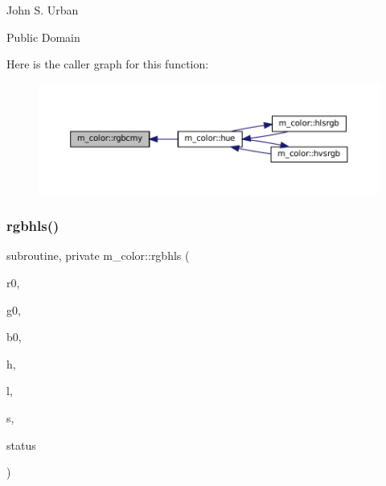 \begin{DoxyDescription}
\item[A\+U\+T\+H\+OR ]

John S. Urban




\item[L\+I\+C\+E\+N\+SE ]

Public Domain




\end{DoxyDescription}Here is the caller graph for this function\+:\nopagebreak
\begin{figure}[H]
\begin{center}
\leavevmode
\includegraphics[width=350pt]{namespacem__color_ad6e8505eef5add299c4475d289f3c5c5_icgraph}
\end{center}
\end{figure}
\mbox{\label{namespacem__color_a1dd027cbe65112af243d26195b1fc49a}} 
\subsubsection{\texorpdfstring{rgbhls()}{rgbhls()}}
{\footnotesize\ttfamily subroutine, private m\+\_\+color\+::rgbhls (\begin{DoxyParamCaption}\item[{real}]{r0,  }\item[{real}]{g0,  }\item[{real}]{b0,  }\item[{real}]{h,  }\item[{real}]{l,  }\item[{real}]{s,  }\item[{integer}]{status }\end{DoxyParamCaption})\hspace{0.3cm}{\ttfamily [private]}}


